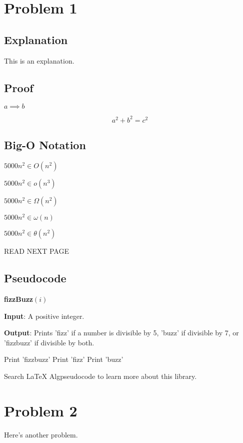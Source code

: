 \documentclass[12pt,letterpaper]{article}
\begin{document}
\section{Problem 1}

\subsection{Explanation}

This is an explanation.

\subsection{Proof}

$a \implies b$

$$ a^2 + b^2 = c^2$$

\subsection{Big-O Notation}

$5000n^2 \in O(n^2)$

$5000n^2 \in o(n^3)$

$5000n^2 \in \Omega(n^2)$

$5000n^2 \in \omega(n)$

$5000n^2 \in \theta(n^2)$

READ NEXT PAGE

\pagebreak %

\subsection{Pseudocode}

\textbf{fizzBuzz}$(i)$

\textbf{Input}: A positive integer.

\textbf{Output}: Prints 'fizz' if a number is divisible by 5, 'buzz' if divisible by 7, or 'fizzbuzz' if divisible by both.

\begin{algorithmic}[1]
        \State Print 'fizzbuzz'
        \State Print 'fizz'
        \State Print 'buzz'
    \EndIf
\end{algorithmic}

Search LaTeX Algpseudocode to learn more about this library.

\section{Problem 2}

Here's another problem.
\end{document}
